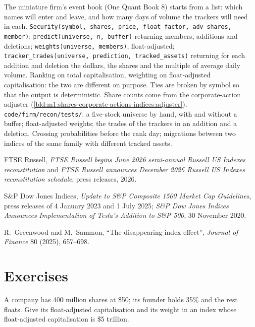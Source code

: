 \begin{build}
 The miniature firm's event book (One Quant Book 8) starts
from a list: which names will enter and leave, and how many days of volume
the trackers will need in each.
 \texttt{Security(symbol, shares, price, float\_factor,
adv\_shares, member)}; \texttt{predict(universe, n, buffer)} returning
members, additions and deletions; \texttt{weights(universe, members)},
float-adjusted; \texttt{tracker\_trades(universe, prediction,
tracked\_assets)} returning for each addition and deletion the dollars, the
shares and the multiple of average daily volume.
 Ranking on total capitalisation, weighting on float-adjusted
capitalisation: the two are different on purpose. Ties are broken by symbol so
that the output is deterministic. Share counts come from the corporate-action
adjuster (\cref{bld:m1:shares-corporate-actions-indices:adjuster}).
 \texttt{code/firm/recon/tests/}: a five-stock
universe by hand, with and without a buffer; float-adjusted weights; the
trades of the trackers in an addition and a deletion.
 Crossing probabilities before the rank day; migrations
between two indices of the same family with different tracked assets.
\end{build}

\begin{omsources}
\item FTSE Russell, \emph{FTSE Russell begins June 2026 semi-annual Russell
US Indexes reconstitution} and \emph{FTSE Russell announces December 2026
Russell US Indexes reconstitution schedule}, press releases, 2026.
\item S\&P Dow Jones Indices, \emph{Update to S\&P Composite 1500 Market Cap
Guidelines}, press releases of 4 January 2023 and 1 July 2025; \emph{S\&P Dow
Jones Indices Announces Implementation of Tesla's Addition to S\&P 500}, 30
November 2020.
\item R.~Greenwood and M.~Sammon, ``The disappearing index effect'',
\emph{Journal of Finance} 80 (2025), 657--698.
\end{omsources}

\section{Exercises}

\begin{exercise}[$\star$]\label{exo:m1:index-construction-and-rebalancing:1}
A company has 400 million shares at \$50; its founder holds 35\% and the rest
floats. Give its float-adjusted capitalisation and its weight in an index
whose float-adjusted capitalisation is \$5 trillion.
\end{exercise}

